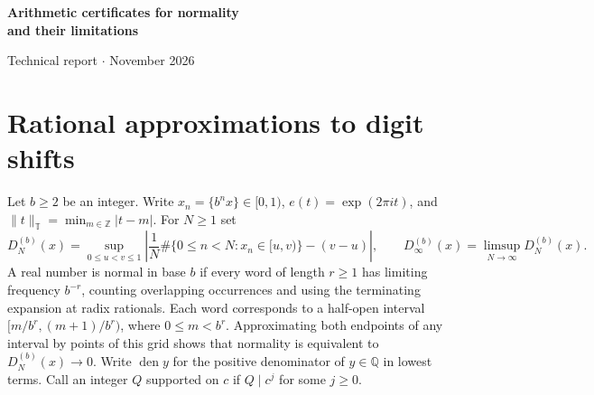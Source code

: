 \documentclass[11pt]{article}
\newcommand{\Q}{\mathbb Q}
\newcommand{\Z}{\mathbb Z}
\newcommand{\T}{\mathbb T}
\newcommand{\circabs}[1]{\lVert #1\rVert_{\T}}
\DeclareMathOperator{\den}{den}
\begin{document}
\begin{center}
{\LARGE\bfseries Arithmetic certificates for normality\\and their limitations\par}
\vspace{0.6em}
{\small Technical report \enspace $\cdot$  November 2026}
\end{center}
\begin{abstract}
We give a sufficient condition for normality in base \(b\) by approximating segments of the radix orbit in mean by rational orbits. The denominators grow on a proportion of segments tending to one, have prime factors in a fixed finite set coprime to \(b\), and are bounded by a fixed power of the segment length. The short exponential sum estimate used here is a qualitative consequence of Vandehey's theorem. If disjoint sets of positions have discrepancy at most \(\delta\) and cover a lower proportion \(g\), the limiting upper discrepancy is at most \(1-g(1-\delta)\). For a binary series supported on the primes \(2,5,13\), we enclose the upper density of simultaneous failures of two denominator tests within an interval of width \(10^{-10}\). We also prove that sufficiently accurate models on overlapping segments agree modulo one when their denominators satisfy the same support and size bounds on the overlap. On prescribed geometric schedules, the set of real numbers admitting arbitrarily accurate models has Lebesgue measure zero, even with unrestricted denominator primes.
\end{abstract}

\section{Rational approximations to digit shifts}
Let \(b\ge2\) be an integer. Write \(x_n=\{b^n x\}\in[0,1)\), \(e(t)=\exp(2\pi i t)\), and
\(\circabs{t}=\min_{m\in\Z}|t-m|\). For \(N\ge1\) set
\[
 D_N^{(b)}(x)=\sup_{0\le u<v\le1}
 \left|\frac1N\#\{0\le n<N:x_n\in[u,v)\}-(v-u)\right|,
 \qquad D_\infty^{(b)}(x)=\limsup_{N\to\infty}D_N^{(b)}(x).
\]
A real number is normal in base \(b\) if every word of length \(r\ge1\) has limiting frequency \(b^{-r}\), counting overlapping occurrences and using the terminating expansion at radix rationals. Each word corresponds to a half-open interval \([m/b^r,(m+1)/b^r)\), where \(0\le m<b^r\). Approximating both endpoints of any interval by points of this grid shows that normality is equivalent to \(D_N^{(b)}(x)\to0\). Write \(\den y\) for the positive denominator of \(y\in\Q\) in lowest terms. Call an integer \(Q\) supported on \(c\) if \(Q\mid c^j\) for some \(j\ge0\).
\end{document}
